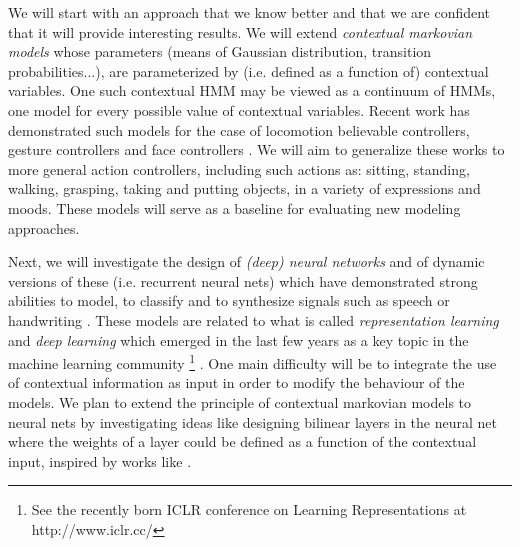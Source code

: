  
We will start with an approach that we know better and that we are confident that it will provide interesting results. We will extend {\it contextual markovian models} whose parameters (means of Gaussian distribution, transition probabilities...), are parameterized by (i.e. defined as a function of) contextual variables. One such contextual HMM may be viewed as a continuum of HMMs, one model for every possible value of contextual variables. Recent work has demonstrated such models for the case of locomotion believable controllers, gesture controllers \cite{DBLP:journals/tog/LevineKTK10} and face controllers \cite{Radenen2014, Ding2013, Ding2014}. We will aim to generalize these works to more general action controllers, including such actions as: sitting, standing, walking, grasping, taking and putting objects, in a variety of expressions and moods. These models will serve as a baseline for evaluating new modeling approaches.



Next, we will investigate the design of {\it (deep) neural networks} and of dynamic versions of these (i.e. recurrent neural nets) which have demonstrated strong abilities to model, to classify and to synthesize signals such as speech or handwriting \cite{Graves2013, DBLP:journals/taslp/Abdel-HamidMJDPY14,DBLP:journals/spm/LingKZSSQMD15}. These models are related to what is called {\it representation learning} and {\it deep learning} which emerged in the last few years as a key topic in the machine learning community \footnote{See the recently born ICLR conference on Learning Representations at http://www.iclr.cc/} \cite{DBLP:journals/corr/ContardoDAG13}.  One main difficulty will be to integrate the use of contextual information as input in order to modify the behaviour of the models. We plan to extend the principle of contextual markovian models to neural nets by investigating ideas like designing bilinear layers in the neural net where the weights of a layer could be defined as a function of the contextual input, inspired by works like \cite{DBLP:conf/mm/ZhongLL11, DBLP:journals/pami/HutchinsonDY13}.

